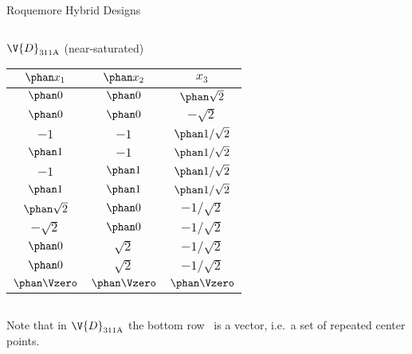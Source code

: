 \documentclass[9pt]{beamer}
\begin{document}
\begin{frame}{Roquemore Hybrid Designs}
\begin{columns}
\begin{column}{0.5\textwidth}
	\begin{center}
		$\V{D}_\mathrm{311A}$ (near-saturated)
		\medskip
		\begin{tabular}{ccc}
			\toprule
			$\phan x_1$ & $\phan x_2$ & $x_3$ \\
			\midrule
			$\phan0$ & $\phan0$ & $\phan\sqrt{2}$ \\
			$\phan0$ & $\phan0$ & $-\sqrt{2}$ \\
			$-1$ & $-1$ & $\phan1/\sqrt{2}$ \\
			$\phan1$ & $-1$ & $\phan1/\sqrt{2}$ \\
			$-1$ & $\phan1$ & $\phan1/\sqrt{2}$ \\
			$\phan1$ & $\phan1$ & $\phan1/\sqrt{2}$ \\
			$\phan\sqrt{2}$ & $\phan0$ & $-1/\sqrt{2}$ \\
			$-\sqrt{2}$ & $\phan0$ & $-1/\sqrt{2}$ \\
			$\phan0$ & $\sqrt{2}$ & $-1/\sqrt{2}$ \\
			$\phan0$ & $\sqrt{2}$ & $-1/\sqrt{2}$ \\
			$\phan\Vzero$ & $\phan\Vzero$ & $\phan\Vzero$ \\
			\bottomrule
		\end{tabular}
	\end{center}
\end{column}
	
\end{columns}

\bigskip
{\footnotesize Note that in $\V{D}_\mathrm{311A}$ the bottom row \Vzero\ is a vector, i.e.\ a set of repeated center points.}

\end{frame}
\end{document}
